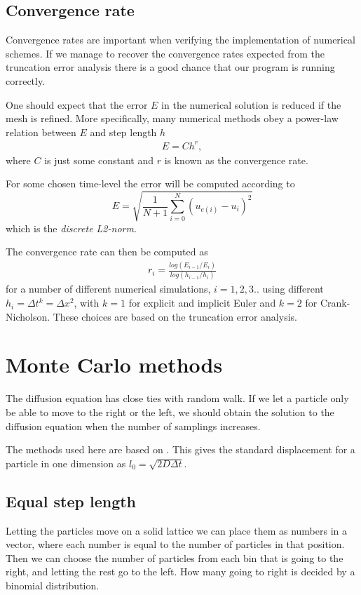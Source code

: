 \documentclass[11pt,a4paper,draft]{article}
\numberwithin{equation}{section}
\begin{document}
\subsection{Convergence rate}

Convergence rates are important when verifying the implementation of numerical schemes. If we manage to recover the convergence rates expected from the truncation error analysis there is a good chance that our program is running correctly.

 One should expect that the error $E$ in the numerical solution is reduced if the mesh is refined. More specifically, many numerical methods obey a power-law relation between $E$ and step length $h$
\begin{align*}
E=Ch^r,
\end{align*}
where $C$ is just some constant and $r$ is known as the convergence rate.  

For some chosen time-level the error will be computed according to 
\begin{equation}
E = \sqrt{\frac{1}{N+1} \sum_{i=0}^{N} (u_{e(i)}-u_{i})^2}
\end{equation}
which is the \emph{discrete L2-norm}. 

The convergence rate can then be computed as
\begin{align*}
r_i = \frac{log(E_{i-1}/E_i)}{log(h_{i-1}/ h_i)}
\end{align*}
for a number of different numerical simulations, $i=1,2,3..$ using different $h_i=\Delta t^k = \Delta x^2 $, with $k=1$ for explicit and implicit Euler and $k=2$ for Crank-Nicholson. These choices are based on the truncation error analysis.  

\section{Monte Carlo methods}

The diffusion equation has close ties with random walk. If we let a 
particle only be able to move to the right or the left, we should obtain
the solution to the diffusion equation when the number of samplings 
increases.

The methods used here are based on \cite{farnell2005monte}. This gives 
the standard displacement for a particle in one dimension 
as $l_0 = \sqrt{2D\Delta t}$.

\subsection{Equal step length}
Letting the particles move on a solid lattice we can place them as 
numbers in a vector, where each number is equal to the number of 
particles in that position. Then we can choose the number of particles
from  each bin that is going to the right, and letting the rest go
to the left. 
How many going to right is decided by a binomial distribution.
\end{document}
